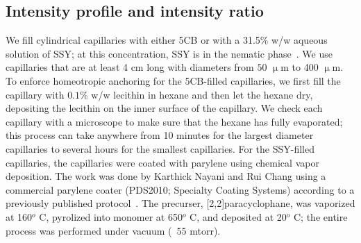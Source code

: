 \subsection{Intensity profile and intensity ratio}
We fill cylindrical capillaries with either 5CB or with a 31.5\% w/w aqueous solution of SSY; at this concentration, SSY is in the nematic phase~\cite{RN303}.
We use capillaries that are at least 4 cm long with diameters from $50$ $\upmu$m to 400 $\upmu$m.
To enforce homeotropic anchoring for the 5CB-filled capillaries, we first fill the capillary with $0.1\%$ w/w lecithin in hexane and then let the hexane dry, depositing the lecithin on the inner surface of the capillary.
We check each capillary with a microscope to make sure that the hexane has fully evaporated; this process can take anywhere from 10 minutes for the largest diameter capillaries to several hours for the smallest capillaries.
For the SSY-filled capillaries, the capillaries were coated with parylene using chemical vapor deposition.
The work was done by Karthick Nayani and Rui Chang using a commercial parylene coater (PDS2010; Specialty Coating Systems) according to a previously published protocol~\cite{RN192}.
The precurser, [2,2]paracyclophane, was vaporized at 160$^o$ C, pyrolized into monomer at 650$^o$ C, and deposited at 20$^o$ C; the entire process was performed under vacuum (~55 mtorr).

